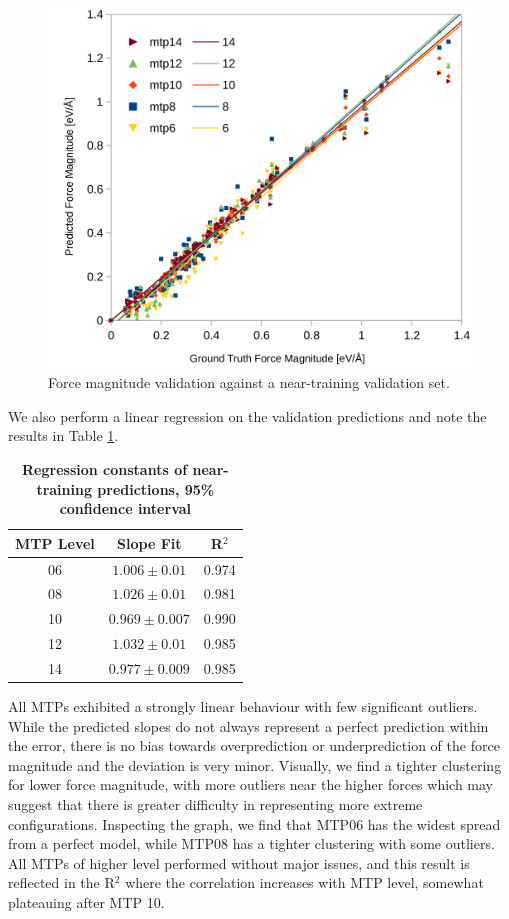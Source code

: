 \documentclass[9pt,twocolumn,twoside]{opticajnl}
\begin{document}
\begin{figure}[ht]
  \centering
  \includegraphics[width=\linewidth]{assets/configurations.png}
  \caption{Force magnitude validation against a near-training validation set.}
  \label{fig:configs}
\end{figure}

We also perform a linear regression on the validation predictions and note the results in Table \ref{tab:configs}.

\begin{table}[htbp]
  \centering
  \caption{\bf Regression constants of near-training predictions, 95\% confidence interval }
  \begin{tabular}{ccc}
  \hline
  MTP Level & Slope Fit &  R$^2$\\ 
  \hline
  06 & $1.006 \pm 0.01$ & 0.974 \\
  08 & $1.026 \pm 0.01$ & 0.981  \\
  10 & $0.969 \pm 0.007$ & 0.990 \\
  12 & $1.032 \pm 0.01$ & 0.985 \\
  14 & $0.977 \pm 0.009$ & 0.985 \\
  \hline
  \end{tabular}
  \label{tab:configs}
\end{table}

All MTPs exhibited a strongly linear behaviour with few significant outliers. While the predicted slopes do not always represent a perfect prediction within the error, there is no bias towards overprediction or underprediction of the force magnitude and the deviation is very minor. Visually, we find a tighter clustering for lower force magnitude, with more outliers near the higher forces which may suggest that there is greater difficulty in representing more extreme configurations. Inspecting the graph, we find that MTP06 has the widest spread from a perfect model, while MTP08 has a tighter clustering with some outliers. All MTPs of higher level performed without major issues, and this result is reflected in the R$^2$ where the correlation increases with MTP level, somewhat plateauing after MTP 10.
\end{document}
